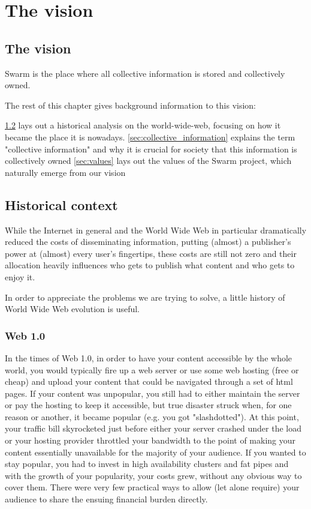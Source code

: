 \chapter{The vision}\label{chap:vision}
\section{The vision}
Swarm is the place where all collective information is stored and collectively owned. 

The rest of this chapter gives background information to this vision: 

\ref{sec:historical_context} lays out a historical analysis on the world-wide-web, focusing on how it became the place it is nowadays.
\ref{sec:collective_information} explains the term "collective information" and why it is crucial for society that this information is collectively owned
\ref{sec:values} lays out the values of the Swarm project, which naturally emerge from our vision

\section{Historical context}\label{sec:historical_context}

While the Internet in general and the World Wide Web in particular dramatically reduced the costs of disseminating information, putting (almost) a publisher's power at (almost) every user's fingertips, these costs are still not zero and their allocation heavily influences who gets to publish what content and who gets to enjoy it.

In order to appreciate the problems we are trying to solve, a little history of World Wide Web evolution is useful.

\subsection{Web 1.0}\label{sec:web_1}

In the times of Web 1.0, in order to have your content accessible by the whole world, you would typically fire up a web server or use some web hosting (free or cheap) and upload your content that could be navigated through a set of html pages. If your content was unpopular, you still had to either maintain the server or pay the hosting to keep it accessible, but true disaster struck when, for one reason or another, it became popular (e.g. you got "slashdotted"). At this point, your traffic bill skyrocketed just before either your server crashed under the load or your hosting provider throttled your bandwidth to the point of making your content essentially unavailable for the majority of your audience. If you wanted to stay popular, you had to invest in high availability clusters and fat pipes and with the growth of your popularity, your costs grew, without any obvious way to cover them. There were very few practical ways to allow (let alone require) your audience to share the ensuing financial burden directly.

